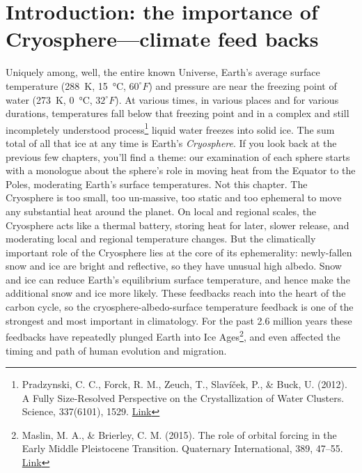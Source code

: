 \documentclass[amstex,12pt]{book}
\begin{document}
\section{Introduction: the importance of Cryosphere---climate feed backs} \label{Feedbacks}
Uniquely among, well, the entire known Universe, Earth's average surface temperature (\SI{288}{\kelvin}, \SI{15}{\celsius}, $60^{\circ}F$) and pressure are near the freezing point of water (\SI{273}{\kelvin}, \SI{0}{\celsius}, $32^{\circ}F$). At various times, in various places and for various durations, temperatures fall below that freezing point and in a complex and still incompletely understood process\footnote{Pradzynski, C. C., Forck, R. M., Zeuch, T., Slavíček, P., \& Buck, U. (2012). A Fully Size-Resolved Perspective on the Crystallization of Water Clusters. Science, 337(6101), 1529. \href{https://doi.org/10.1126/science.1225468}{Link}} liquid water freezes into solid ice. The sum total of all that ice at any time is Earth's \emph{Cryosphere}. If you look back at the previous few chapters, you'll find a theme: our examination of each sphere starts with a monologue about the sphere's role in moving heat from the Equator to the Poles, moderating Earth's surface temperatures. Not this chapter. The Cryosphere is too small, too un-massive, too static and too ephemeral to move any substantial heat around the planet. On local and regional scales, the Cryosphere acts like a thermal battery, storing heat for later, slower release, and moderating local and regional temperature changes. But the climatically important role of the Cryosphere lies at the core of its ephemerality: newly-fallen snow and ice are bright and reflective, so they have unusual high albedo. Snow and ice can reduce Earth's equilibrium surface temperature, and hence make the additional snow and ice more likely. These feedbacks reach into the heart of the carbon cycle, so the cryosphere-albedo-surface temperature feedback is one of the strongest and most important in climatology. For the past 2.6 million years these feedbacks have repeatedly plunged Earth into Ice Ages\footnote{Maslin, M. A., \& Brierley, C. M. (2015). The role of orbital forcing in the Early Middle Pleistocene Transition. Quaternary International, 389, 47–55. \href{https://doi.org/10.1016/j.quaint.2015.01.047}{Link}}, and even affected the timing and path of human evolution and migration.\\
\end{document}
